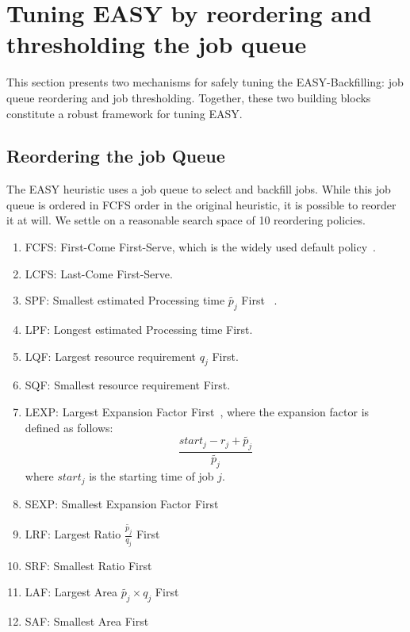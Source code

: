 \documentclass[sigconf,anonymous]{acmart}
\begin{document}
\section{Tuning EASY by reordering and thresholding the job queue}
\label{sec:framework}

This section presents two mechanisms for safely tuning the EASY-Backfilling:
job queue reordering and job thresholding. Together, these two building blocks
constitute a robust framework for tuning EASY.

\subsection{Reordering the job Queue}
\label{subsec:policies}

The EASY heuristic uses a job queue to select and backfill jobs. While this job
queue is ordered in FCFS order in the original heuristic, it is possible to
reorder it at will. We settle on a reasonable search space of 10 reordering policies.

\begin{enumerate}
  \item FCFS: First-Come First-Serve, which is the widely used default policy~\cite{easy}.
  \item LCFS: Last-Come First-Serve.
  \item SPF: Smallest estimated Processing time $\widetilde{p_{j}}$ First ~\cite{bfchar}.
  \item LPF: Longest estimated Processing time First.
  \item LQF: Largest resource requirement $q_j$ First.
  \item SQF: Smallest resource requirement First.
  \item LEXP: Largest Expansion Factor First~\cite{bfchar}, where the expansion
    factor is defined as follows:
  \begin{equation} \frac{start_j - r_j + \widetilde{p_j}}{\widetilde{p_j}} \end{equation}
  where $start_j$ is the starting time of job $j$.
  \item SEXP: Smallest Expansion Factor First
  \item LRF: Largest Ratio $\frac{\widetilde{p_j}}{q_j}$ First
  \item SRF: Smallest Ratio First
  \item LAF: Largest Area $ \widetilde{p_j} \times q_j$ First
  \item SAF: Smallest Area First
\end{enumerate}
\end{document}

